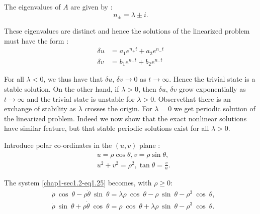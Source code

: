  The eigenvalues of $A$ are given by :
  \begin{equation*}
n_{\pm} = \lambda \pm i. \tag{1.27}\label{chap1-sec1.2-eq1.27}
 \end{equation*} 
 
 These eigenvalues are distinct and hence the solutions of the
 linearized problem must have the form : 
  \begin{equation*}
\begin{split}
 \delta u & = a_{1}e ^{n_{+}t} + a_{2}e ^{n_{-}t} \\
 \delta v & = b_{1}e ^{n_{+}t} + b_{2}e ^{n_{-}t} 
\end{split}\tag{1.28} \label{chap1-sec1.2-eq1.28}
\end{equation*}

For all $\lambda < 0$, we thus have that $\delta u$, $\delta v \to 0$
 as $t \to \infty$. Hence the trivial state is a stable solution. On
 the other hand, if $\lambda > 0$, then $\delta u$, $\delta v$ grow
 exponentially as $t \to \infty$ and the trivial state is unstable for
 $\lambda > 0$.  
  Observe\pageoriginale that there is an exchange of stability as
  $\lambda$ crosses 
 the origin. For $\lambda = 0$ we get periodic solution of the
 linearized problem. Indeed we now show that the exact nonlinear
 solutions have similar feature, but that stable periodic solutions
 exist for all $\lambda > 0$.  
 
 Introduce polar co-ordinates in the $(u,v)$ plane :
\begin{equation*}
 \begin{split}
& u  = \rho \cos \theta , v = \rho \sin \theta,\\ 
& u^{2}+v^{2}   = \rho^{2} , \tan \theta = \frac{v}{u}.
 \end{split}
\tag{1.29} \label{chap1-sec1.2-eq1.29}
\end{equation*}

The system \eqref{chap1-sec1.2-eq1.25} becomes, with $\rho \ge 0$:
\begin{equation*}
\begin{split}
& \dot{\rho} ~\cos ~\theta - \rho \dot{\theta} ~\sin~ \theta = \lambda
\rho ~\cos ~\theta -\rho ~\sin~ \theta - \rho^{3} ~\cos~
\theta,\\ 
& \dot{\rho} ~\sin ~\theta + \rho \dot{\theta} ~\cos~ \theta = \rho
~\cos ~\theta +\lambda\rho ~\sin~ \theta - \rho^{3} ~\cos~ \theta . 
\end{split}
\tag{1.30} \label{chap1-sec1.2-eq1.30}
\end{equation*}

